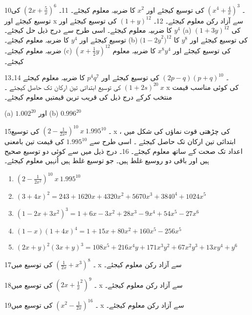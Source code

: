 10۔
\( ({x}^{4}+\frac{4}{x})^{3}\)
کی توسیع کیجئے اور
\( {x}^{2}\)
کا ضربیہ معلوم کیجئے۔ 
11۔
\(({2x}+\frac{5}{x})^{6}\)
کی توسیع کیجئے اور
   x
سے آزاد  رکن  معلوم کیجئے۔ 
12۔   
\( {(1+y)}^{12}\)
کی توسیع کیجئے اور
\( {y}^{4}\)
کا ضربیہ معلوم کیجئے۔   اسی طرح سے درج ذیل حل کیجئے۔
	(a)
  \({(1+3y)}^{12}\)
کی توسیع کیجئے اور
   \( {y}^{4}\)
کا ضربیہ معلوم کیجئے۔
	(b) 
  \({(1-2y}^{2})^{12}\)
کی توسیع کیجئے اور
   \( {y}^{8}\)
کا ضربیہ معلوم کیجئے۔
	(c)
 \( ({x}+\frac{1}{2}{y})^{12}\)
کی توسیع کیجئے اور
  \( {x}^{8}{y}^{4}\)
کا ضربیہ معلوم کیجئے۔


13۔ 
\({(2p-q)}{(p+q)}^{10}\)
کی توسیع کیجئے اور
\({p}^{4}{q}^{7}\)
کا ضربیہ معلوم کیجئے
14۔ 
\({(1+2s)}^{20}\ {x}\)
کی توسیع   ابتدائی تین ارکان تک حاصل کیجئے ۔ 
  x
کی کوئی مناسب قیمت منتخب کرکے درج ذیل کی قریب ترین قیمتیں معلوم کیجئے۔
 
	(a)
	 \( {1.002}^{20}\)
اور
 (b)
   \({0.996}^{20}\)
 
15۔
\(({2}-\frac{1}{2x^{2}})^{10}\ {x}\ {1.995}^{10}\) 
کی توسیع
 x
کی چڑھتی قوت نماؤں کی شکل میں ،  ابتدائی تین ارکان تک حاصل کیجئے ۔   اسی طرح سے 
\(1.995^{10}\)
  کی قیمت تین بامعنی اعداد تک صحت کے ساتھ معلوم کیجئے۔
16۔ درج ذیل میں سے کوئی دو توسیع صحیح ہیں اور باقی دو روسیع غلط ہیں۔  جو توسیع غلط ہیں اُنہیں معلوم کیجئے۔ 
\begin{enumerate}
\item
\(({2}-\frac{1}{2x^{2}})^{10}\ {x}\ {1.995}^{10}\) \\
\item
\( {(3+4x)}^{2}=243+1620{x}+4320{x}^{2}+5670{x}^{3}+3840^{4}+1024{x}^{5}\)\\
\item
\( {(1-2x+3{x}^{2})}^{3}=1+6{x}-3{x}^{2}+28{x}^{3}-9{x}^{4}+54{x}^{5}-27{x}^{6}\)\\
\item
\({(1-x)}{(1+4{x})^{4}}=1+ 15{x}+80{x}^{2}+160{x}^{5}-256{x}^{5}\)\\
\item
\({(2x+y)}^{2}{(3x+y)}^{3}=108{x}^{5}+216{x}^{4}{y}+171{x}^{3}{y}^{2}+67{x}^{2}{y}^{3}+13{x}{y}^{4}+{y}^{6}\)\\
\end{enumerate}
17۔
  \(({\frac{1}{2x}+{x}^{3}})^{8}\)
کی توسیع میں 
 x
سے آزاد رکن معلوم کیجئے۔

18۔
   \(({2x}+\frac{1}{x}^{2})^{9}\)
کی توسیع میں
x
 سے آزاد رکن معلوم کیجئے۔

19۔
    \(({x}^{2}-\frac{1}{2x})^{16}\)
کی توسیع میں
   x
سے آزاد رکن معلوم کیجئے۔


